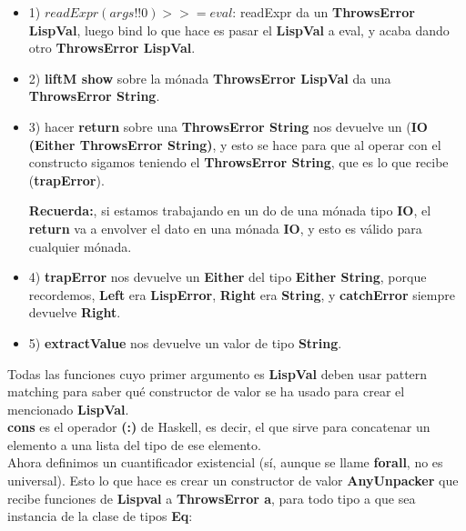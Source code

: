 \begin{itemize}

\item 1) $readExpr (args !! 0) >>= eval$: readExpr da un \textbf{ThrowsError LispVal}, luego bind lo que hace es pasar el \textbf{LispVal} a eval, y acaba dando otro \textbf{ThrowsError LispVal}.

\item 2) \textbf{liftM show} sobre la m\'onada \textbf{ThrowsError LispVal} da una \textbf{ThrowsError String}.

\item 3) hacer \textbf{return} sobre una \textbf{ThrowsError String} nos devuelve un (\textbf{IO (Either ThrowsError String)}, y esto se hace para que al operar con el constructo \textbf{\<\-} sigamos teniendo el \textbf{ThrowsError String}, que es lo que recibe (\textbf{trapError}).

\textbf{Recuerda:}, si estamos trabajando en un do de una m\'onada tipo \textbf{IO}, el \textbf{return} va a envolver el dato en una m\'onada \textbf{IO}, y esto es v\'alido para cualquier m\'onada.

\item 4) \textbf{trapError} nos devuelve un \textbf{Either} del tipo \textbf{Either String}, porque recordemos, \textbf{Left} era \textbf{LispError}, \textbf{Right} era \textbf{String}, y \textbf{catchError} siempre devuelve \textbf{Right}.

\item 5) \textbf{extractValue} nos devuelve un valor de tipo \textbf{String}.
\end{itemize}

Todas las funciones cuyo primer argumento es \textbf{LispVal} deben usar pattern matching para saber qu\'e constructor de valor se ha usado para crear el mencionado \textbf{LispVal}.\\

\textbf{cons} es el operador \textbf{(:)} de Haskell, es decir, el que sirve para concatenar un elemento a una lista del tipo de ese elemento.\\

Ahora definimos un cuantificador existencial (s\'i, aunque se llame \textbf{forall}, no es universal). Esto lo que hace es crear un constructor de valor \textbf{AnyUnpacker} que recibe funciones de \textbf{Lispval} a \textbf{ThrowsError a}, para todo tipo a que sea instancia de la clase de tipos \textbf{Eq}:\\

